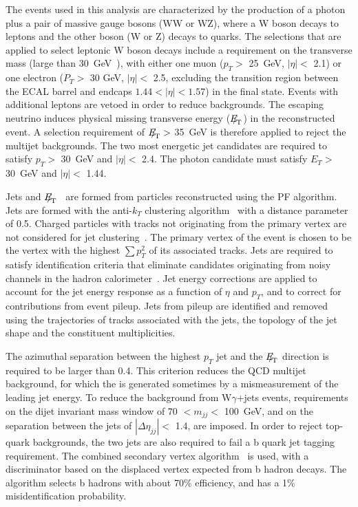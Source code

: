 The events used in this analysis are characterized by the production
of a photon plus a pair of massive gauge bosons (WW or WZ), where a
W boson decays to leptons and the other boson (W or Z) decays to
quarks. The selections that are applied to select leptonic W boson decays include a
requirement on the transverse mass (large than 30~GeV~\cite{WZCMS:2010}), with either 
one muon ($p_T >$ 25~GeV, $|\eta| <$ 2.1) or one electron ($P_T >$ 30 GeV, $|\eta| <$ 2.5, excluding the transition 
region between the ECAL barrel and endcaps $1.44 < |\eta| < 1.57$) in the final state. Events with
additional leptons are vetoed in order to reduce backgrounds. The escaping 
neutrino induces physical missing transverse energy (${E\!\!\!/}_{\!\mathrm{T}}$) in the reconstructed 
event. A selection requirement of ${E\!\!\!/}_{\!\mathrm{T}} >$ 35~GeV 
is therefore applied to reject the multijet backgrounds. The two most energetic jet candidates are required to
satisfy $p_T >$ 30~GeV and $|\eta| <$ 2.4. The photon candidate must satisfy $E_T >$ 30~GeV and $|\eta| <$ 1.44. 


Jets and 
${E\!\!\!/}_{\!\mathrm{T}}$~\cite{Chatrchyan:2011tn,WZCMS:2010} are formed from particles reconstructed using the PF algorithm.
Jets are formed with the anti-$k_T$ clustering
algorithm~\cite{ANTIKT} with a distance parameter of 0.5. 
Charged particles with tracks not originating from
the primary vertex are not considered for jet
clustering~\cite{fastjet1, fastjet2}. The primary vertex of the event is chosen to be the vertex with the highest
$\sum p_T^2$ of its associated tracks.
Jets are required to satisfy
identification criteria that eliminate candidates originating from noisy
channels in the hadron calorimeter~\cite{Chatrchyan:2009hy}.  Jet
energy corrections \cite{Chatrchyan:2011ds} are applied to
account for the jet energy response as a function of $\eta$ and $p_{T}$,
and to correct for contributions from event pileup. Jets from pileup are
identified and removed using the trajectories of tracks associated with the jets, 
the topology of the jet shape and the constituent multiplicities.

The azimuthal separation between the highest $p_T$ jet and the ${E\!\!\!/}_{\!\mathrm{T}}$
direction is required to be larger
than 0.4. This criterion reduces the QCD multijet background, for
which the \MET is generated sometimes by a mismeasurement of the
leading jet energy. To
reduce the background from W$\gamma$+jets events, requirements on the
dijet invariant mass window of 70 $< m_{jj} <$ 100~GeV, and on the
separation between the jets of $|\Delta\eta_{jj}| <$ 1.4, are
imposed. In order to reject top-quark backgrounds, the two jets are
also required to fail a b quark jet tagging requirement. The combined
secondary vertex algorithm~\cite{Chatrchyan:2012jua} is used, with a
discriminator based on the displaced vertex expected from b hadron
decays. The algorithm selects b hadrons with about 70\% efficiency,
and has a 1\% misidentification probability.

